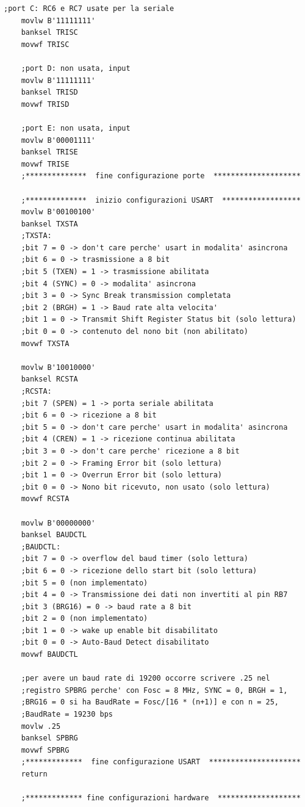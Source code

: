 \documentclass{article}
\begin{document}
\begin{lstlisting}[frame=single]
	;port C: RC6 e RC7 usate per la seriale
	movlw B'11111111'
	banksel TRISC
	movwf TRISC
	
	;port D: non usata, input
	movlw B'11111111'
	banksel TRISD
	movwf TRISD
	
	;port E: non usata, input
	movlw B'00001111'
	banksel TRISE
	movwf TRISE
	;**************  fine configurazione porte  ********************
	
	;**************  inizio configurazioni USART  ******************
	movlw B'00100100'
	banksel TXSTA
	;TXSTA:
	;bit 7 = 0 -> don't care perche' usart in modalita' asincrona
	;bit 6 = 0 -> trasmissione a 8 bit
	;bit 5 (TXEN) = 1 -> trasmissione abilitata
	;bit 4 (SYNC) = 0 -> modalita' asincrona
	;bit 3 = 0 -> Sync Break transmission completata
	;bit 2 (BRGH) = 1 -> Baud rate alta velocita'
	;bit 1 = 0 -> Transmit Shift Register Status bit (solo lettura)
	;bit 0 = 0 -> contenuto del nono bit (non abilitato)
	movwf TXSTA
	
	movlw B'10010000'
	banksel RCSTA
	;RCSTA:
	;bit 7 (SPEN) = 1 -> porta seriale abilitata
	;bit 6 = 0 -> ricezione a 8 bit
	;bit 5 = 0 -> don't care perche' usart in modalita' asincrona
	;bit 4 (CREN) = 1 -> ricezione continua abilitata
	;bit 3 = 0 -> don't care perche' ricezione a 8 bit
	;bit 2 = 0 -> Framing Error bit (solo lettura)
	;bit 1 = 0 -> Overrun Error bit (solo lettura)
	;bit 0 = 0 -> Nono bit ricevuto, non usato (solo lettura)
	movwf RCSTA
	
	movlw B'00000000'
	banksel BAUDCTL
	;BAUDCTL:
	;bit 7 = 0 -> overflow del baud timer (solo lettura)
	;bit 6 = 0 -> ricezione dello start bit (solo lettura)
	;bit 5 = 0 (non implementato)
	;bit 4 = 0 -> Transmissione dei dati non invertiti al pin RB7
	;bit 3 (BRG16) = 0 -> baud rate a 8 bit
	;bit 2 = 0 (non implementato)
	;bit 1 = 0 -> wake up enable bit disabilitato
	;bit 0 = 0 -> Auto-Baud Detect disabilitato
	movwf BAUDCTL
	
	;per avere un baud rate di 19200 occorre scrivere .25 nel 
	;registro SPBRG perche' con Fosc = 8 MHz, SYNC = 0, BRGH = 1, 
	;BRG16 = 0 si ha BaudRate = Fosc/[16 * (n+1)] e con n = 25,
	;BaudRate = 19230 bps
	movlw .25
	banksel SPBRG
	movwf SPBRG
	;*************  fine configurazione USART  *********************
	return

	;************* fine configurazioni hardware  *******************
	\end{lstlisting}
\end{document}

